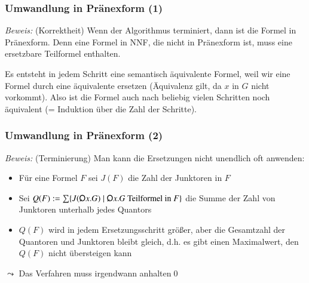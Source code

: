 \documentclass[aspectratio=1610,onlymath]{beamer}
\begin{document}
\begin{frame}[t]\frametitle{Umwandlung in Pränexform (1)}

\pause

\emph{Beweis:} (Korrektheit) Wenn der Algorithmus terminiert, dann ist die Formel in Pränexform.
Denn eine Formel in NNF, die nicht in Pränexform ist, muss eine ersetzbare Teilformel enthalten.\bigskip\pause

Es entsteht in jedem Schritt eine semantisch äquivalente Formel, weil
wir eine Formel durch eine äquivalente ersetzen (Äquivalenz gilt, da $x$ in $G$ nicht vorkommt). Also ist die Formel auch nach beliebig vielen Schritten noch äquivalent (= Induktion über die Zahl der Schritte).

\end{frame}

\begin{frame}[t]\frametitle{Umwandlung in Pränexform (2)}


\emph{Beweis:} (Terminierung) Man kann die Ersetzungen nicht unendlich oft anwenden:\pause
\begin{itemize}
\item Für eine Formel $F$ sei $J(F)$ die Zahl der Junktoren in $F$
\item Sei $Q(F)\defeq \sum\{J(\quantor x.G)\mid \quantor x.G\text{ Teilformel in }F\}$
die Summe der Zahl von Junktoren unterhalb jedes Quantors\pause
\item $Q(F)$ wird in jedem Ersetzungsschritt größer, aber die Gesamtzahl der Quantoren und Junktoren bleibt gleich, d.h. es gibt
einen Maximalwert, den $Q(F)$ nicht übersteigen kann
\end{itemize}
$\leadsto$ Das Verfahren muss irgendwann anhalten\qed

\end{frame}
\end{document}
